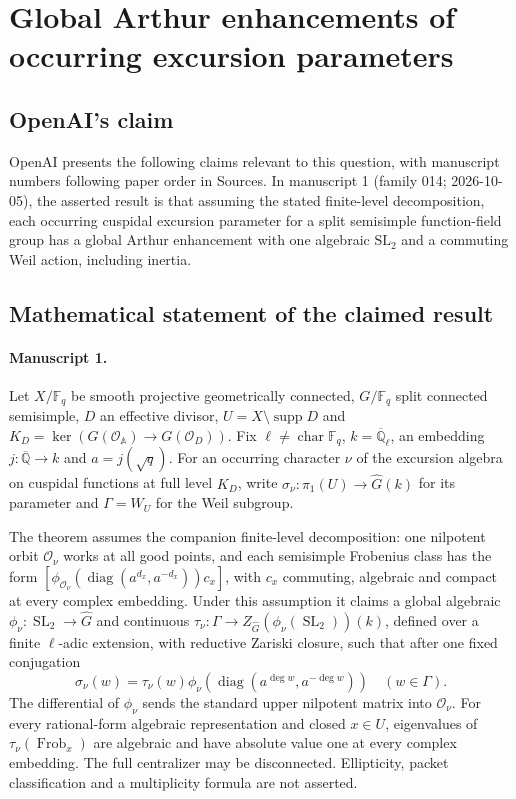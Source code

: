 \documentclass[11pt]{article}
\begin{document}
\section*{Global Arthur enhancements of occurring excursion parameters}

\subsection{OpenAI's claim}
OpenAI presents the following claims relevant to this question, with manuscript numbers following paper order in Sources. In manuscript 1 (family 014; 2026-10-05), the asserted result is that assuming the stated finite-level decomposition, each occurring cuspidal excursion parameter for a split semisimple function-field group has a global Arthur enhancement with one algebraic $\mathrm{SL}_2$ and a commuting Weil action, including inertia.

\subsection{Mathematical statement of the claimed result}
\paragraph{Manuscript 1.}
Let $X/\mathbb F_q$ be smooth projective geometrically connected, $G/\mathbb F_q$ split connected semisimple, $D$ an effective divisor, $U=X\setminus\operatorname{supp}D$ and $K_D=\ker(G(\mathcal O_{\mathbb A})\to G(\mathcal O_D))$. Fix $\ell\ne\operatorname{char}\mathbb F_q$, $k=\overline{\mathbb Q}_{\ell}$, an embedding $j:\overline{\mathbb Q}\to k$ and $a=j(\sqrt q)$. For an occurring character $\nu$ of the excursion algebra on cuspidal functions at full level $K_D$, write $\sigma_{\nu}:\pi_1(U)\to\widehat G(k)$ for its parameter and $\Gamma=W_U$ for the Weil subgroup.

The theorem assumes the companion finite-level decomposition: one nilpotent orbit $\mathcal O_{\nu}$ works at all good points, and each semisimple Frobenius class has the form $[\phi_{\mathcal O_{\nu}}(\operatorname{diag}(a^{d_x},a^{-d_x}))c_x]$, with $c_x$ commuting, algebraic and compact at every complex embedding. Under this assumption it claims a global algebraic $\phi_{\nu}:\operatorname{SL}_2\to\widehat G$ and continuous $\tau_{\nu}:\Gamma\to Z_{\widehat G}(\phi_{\nu}(\operatorname{SL}_2))(k)$, defined over a finite $\ell$-adic extension, with reductive Zariski closure, such that after one fixed conjugation
\[
 \sigma_{\nu}(w)=\tau_{\nu}(w)\phi_{\nu}(\operatorname{diag}(a^{\deg w},a^{-\deg w}))\quad(w\in\Gamma).
\]
The differential of $\phi_{\nu}$ sends the standard upper nilpotent matrix into $\mathcal O_{\nu}$. For every rational-form algebraic representation and closed $x\in U$, eigenvalues of $\tau_{\nu}(\operatorname{Frob}_x)$ are algebraic and have absolute value one at every complex embedding. The full centralizer may be disconnected. Ellipticity, packet classification and a multiplicity formula are not asserted.
\end{document}
